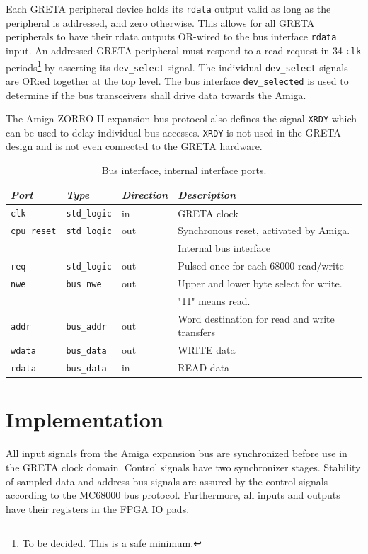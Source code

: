 \documentclass[a4paper]{report}
\begin{document}
Each GRETA peripheral device holds its \texttt{rdata}
output valid as long as the peripheral is addressed, and zero
otherwise. This allows for all GRETA peripherals to have their
rdata outputs OR-wired to the bus interface \texttt{rdata}
input. An addressed GRETA peripheral must respond to a read
request in 34 \texttt{clk} periods\footnote{To be decided. This
is a safe minimum.} by asserting its \texttt{dev\_select}
signal. The individual \texttt{dev\_select} signals
are OR:ed together at the top level. The bus interface
\texttt{dev\_selected} is used to determine if the bus
transceivers shall drive data towards the Amiga.

The Amiga ZORRO II expansion bus protocol also defines the
signal \texttt{XRDY} which can be used to delay individual
bus accesses. \texttt{XRDY} is not used in the GRETA design
and is not even connected to the GRETA hardware.

\begin{table}
\begin{tabular}{*4l}    \toprule
\emph{Port} & \emph{Type}  & \emph{Direction}  & \emph{Description} \\ \midrule
\texttt{clk}        & \texttt{std\_logic}& in  & GRETA clock\\
\texttt{cpu\_reset} & \texttt{std\_logic}& out & Synchronous reset, activated by Amiga. \\
\midrule
\midrule
                    &                   &       & Internal bus interface \\
\midrule
\texttt{req}        & \texttt{std\_logic}& out & Pulsed once for each 68000 read/write \\
\texttt{nwe}        & \texttt{bus\_nwe} & out  & Upper and lower byte select for write.\\
                    &                   &      & "11" means read. \\
\texttt{addr}       & \texttt{bus\_addr}& out  & Word destination for read and write transfers \\ 
\texttt{wdata}      & \texttt{bus\_data}& out  & WRITE data \\
\texttt{rdata}      & \texttt{bus\_data}& in   & READ data \\
\midrule
\bottomrule
 \hline
\end{tabular}
\caption{Bus interface, internal interface ports.}
\label{bus_interface}
\end{table}

\section{Implementation}
All input signals from the Amiga expansion bus are synchronized
before use in the GRETA clock domain. Control signals have two
synchronizer stages. Stability of sampled data and address
bus signals are assured by the control signals according to
the MC68000 bus protocol. Furthermore, all inputs and outputs
have their registers in the FPGA IO pads.
\end{document}
